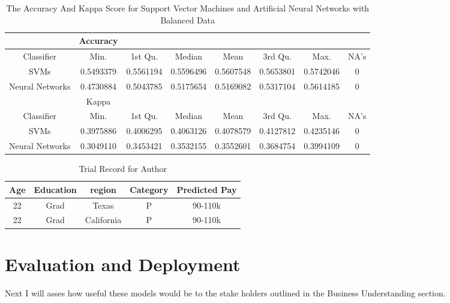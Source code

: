 \documentclass{article}
\begin{document}
    \begin{center}
        \begin{table}
            \centering
            \begin{tabular}{ |c|c|c|c|c|c|c|c| }
                \hline
                & Accuracy \\
                \hline
                Classifier & Min. & 1st Qu. & Median & Mean & 3rd Qu. & Max. & NA's \\
                SVMs & 0.5493379 & 0.5561194 & 0.5596496 & 0.5607548 & 0.5653801 & 0.5742046 & 0 \\
                Neural Networks & 0.4730884 & 0.5043785 & 0.5175654 & 0.5169082 & 0.5317104 & 0.5614185 & 0 \\
                \hline
                & Kappa \\
                \hline
                Classifier & Min. & 1st Qu. & Median & Mean & 3rd Qu. & Max. & NA's \\
                SVMs & 0.3975886 & 0.4006295 & 0.4063126 & 0.4078579 & 0.4127812 & 0.4235146 & 0 \\
                Neural Networks & 0.3049110 & 0.3453421 & 0.3532155 & 0.3552601 & 0.3684754 & 0.3994109 & 0 \\
                \hline
            \end{tabular}
            \caption{The Accuracy And Kappa Score for Support Vector Machines and Artificial Neural Networks with Balanced Data}
            \label{tab:13}
        \end{table}
    \end{center}

    \begin{center}
        \begin{table}
            \centering
            \begin{tabular}{ |c|c|c|c|c| }
                \hline
                Age & Education & region & Category & Predicted Pay \\
                \hline
                22 & Grad & Texas & P & 90-110k \\
                22 & Grad & California & P & 90-110k \\
                \hline
            \end{tabular}
            \caption{Trial Record for Author}
            \label{tab:14}
        \end{table}
    \end{center}

\section{Evaluation and Deployment}
Next I will asses how useful these models would be to the stake holders outlined in the Business Understanding section.
\end{document}
